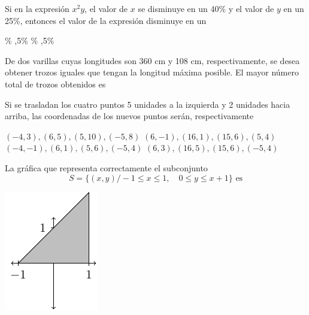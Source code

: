 \documentclass[10pt,letterpaper,addpoints]{exam}
\begin{document}
\begin{multicols}{2}
\begin{questions}
\question
Si en la expresión $ x^2y $, el valor de $ x $ se disminuye en un 40\% y el valor de $ y $ en un 25\%, entonces el valor de la expresión disminuye en un

\begin{oneparchoices}
\% ,5\% \% ,5\%
\end{oneparchoices}
\question
De dos varillas cuyas longitudes son 360 cm y 108 cm, respectivamente, se desea obtener trozos iguales que tengan la longitud máxima posible. El mayor número total de trozos obtenidos es

\begin{oneparchoices}
        
\end{oneparchoices}
\question Si se trasladan los cuatro puntos 5 unidades a la izquierda y 2 unidades hacia arriba, las coordenadas de los nuevos puntos serán, respectivamente
\begin{center}
\end{center}
\begin{choices}
  \CorrectChoice $(-4,3), (6,5), (5,10), (-5,8)$
  \choice $(6,-1), (16,1), (15,6), (5,4)$
  \choice $(-4,-1), (6,1), (5,6), (-5,4)$
  \choice $(6,3), (16,5), (15,6), (-5,4)$
\end{choices}
  \question La gráfica que representa correctamente el subconjunto \[ S=\{(x,y)/ -1\leq x\leq 1, \quad 0\leq y \leq x+1\} \text{ es} \]
\begin{choices}
\begin{multicols}{2}
\CorrectChoice \includegraphics[scale=.75]{Images/desigA.pdf} 

\end{multicols}
\end{choices}
\end{questions}
\end{multicols}
\end{document}
